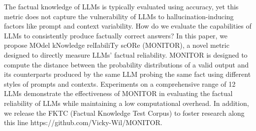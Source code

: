 The factual knowledge of LLMs is typically evaluated using accuracy, yet this metric does not capture the vulnerability of LLMs to hallucination-inducing factors like prompt and context variability. How do we evaluate the capabilities of LLMs to consistently produce factually correct answers? In this paper, we propose MOdel kNowledge relIabiliTy scORe (MONITOR), a novel metric designed to directly measure LLMs' factual reliability. MONITOR is designed to compute the distance between the probability distributions of a valid output and its counterparts produced by the same LLM probing the same fact using different styles of prompts and contexts. Experiments on a comprehensive range of 12 LLMs demonstrate the effectiveness of MONITOR in evaluating the factual reliability of LLMs while maintaining a low computational overhead. In addition, we release the FKTC (Factual Knowledge Test Corpus) to foster research along this line https://github.com/Vicky-Wil/MONITOR.